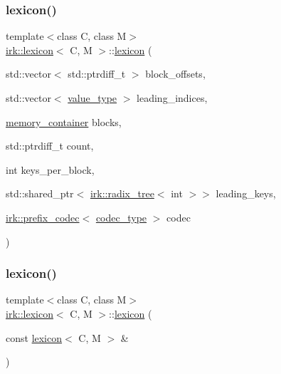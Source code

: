 \mbox{\label{classirk_1_1lexicon_a11bacbecd3c53c7a212ff7c0e25c3f5e}} 
\subsubsection{\texorpdfstring{lexicon()}{lexicon()}\hspace{0.1cm}{\footnotesize\ttfamily [2/4]}}
{\footnotesize\ttfamily template$<$class C, class M$>$ \\
\mbox{\hyperlink{classirk_1_1lexicon}{irk\+::lexicon}}$<$ C, M $>$\+::\mbox{\hyperlink{classirk_1_1lexicon}{lexicon}} (\begin{DoxyParamCaption}\item[{std\+::vector$<$ std\+::ptrdiff\+\_\+t $>$}]{block\+\_\+offsets,  }\item[{std\+::vector$<$ \mbox{\hyperlink{classirk_1_1lexicon_aeac00a0cdd67339d9d09783a1c930dd2}{value\+\_\+type}} $>$}]{leading\+\_\+indices,  }\item[{\mbox{\hyperlink{classirk_1_1lexicon_a2097b1f4bfc324504a9fe10af681b0be}{memory\+\_\+container}}}]{blocks,  }\item[{std\+::ptrdiff\+\_\+t}]{count,  }\item[{int}]{keys\+\_\+per\+\_\+block,  }\item[{std\+::shared\+\_\+ptr$<$ \mbox{\hyperlink{classirk_1_1radix__tree}{irk\+::radix\+\_\+tree}}$<$ int $>$$>$}]{leading\+\_\+keys,  }\item[{\mbox{\hyperlink{classirk_1_1prefix__codec}{irk\+::prefix\+\_\+codec}}$<$ \mbox{\hyperlink{classirk_1_1lexicon_a3ec38dbe131c7b0a9551d05ad619fc89}{codec\+\_\+type}} $>$}]{codec }\end{DoxyParamCaption})\hspace{0.3cm}{\ttfamily [inline]}}

\mbox{\label{classirk_1_1lexicon_a90aa432b9b358af16a22b7ce990c1ebb}} 
\subsubsection{\texorpdfstring{lexicon()}{lexicon()}\hspace{0.1cm}{\footnotesize\ttfamily [3/4]}}
{\footnotesize\ttfamily template$<$class C, class M$>$ \\
\mbox{\hyperlink{classirk_1_1lexicon}{irk\+::lexicon}}$<$ C, M $>$\+::\mbox{\hyperlink{classirk_1_1lexicon}{lexicon}} (\begin{DoxyParamCaption}\item[{const \mbox{\hyperlink{classirk_1_1lexicon}{lexicon}}$<$ C, M $>$ \&}]{ }\end{DoxyParamCaption})\hspace{0.3cm}{\ttfamily [default]}}

